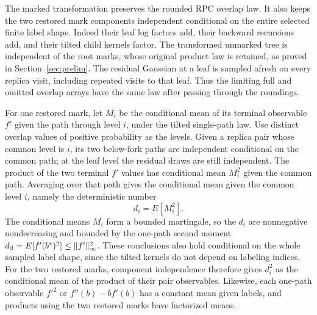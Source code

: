 \documentclass[11pt]{article}
\begin{document}
The marked transformation preserves the rounded RPC overlap law. It also
keeps the two restored mark components independent conditional on the
entire selected finite label shape. Indeed their leaf log factors add,
their backward recursions add, and their tilted child kernels factor.
The transformed unmarked tree is independent of the root marks, whose
original product law is retained, as proved in
Section~\ref{sec:prelim}. The residual Gaussian at a leaf is sampled
afresh on every replica visit, including repeated visits to that leaf.
Thus the limiting full and omitted overlap arrays have the same law after
passing through the roundings.

For one restored mark, let $M_i$ be the conditional mean of its terminal
observable $f'$ given the path through level $i$, under the tilted
single-path law. Use distinct overlap values of positive probability as
the levels. Given a replica pair whose common level is $i$, its two
below-fork paths are independent conditional on the common path; at the
leaf level the residual draws are still independent. The product of the two terminal $f'$ values has conditional mean
$M_i^2$ given the common path. Averaging over that path gives the
conditional mean given the common level $i$, namely the deterministic number
\[
 d_i=E[M_i^2].
\]
The conditional means $M_i$ form a bounded martingale, so the $d_i$ are
nonnegative nondecreasing and bounded by the one-path second moment
$d_{\rm d}=E[f'(b^*)^2]\le\|f'\|_\infty^2$. These conclusions also hold
conditional on the whole sampled label shape, since the tilted kernels
do not depend on labeling indices. For the two restored marks, component
independence therefore gives $d_i^2$ as the conditional mean of the product
of their pair observables. Likewise, each one-path observable $f'^2$ or
$f''(b)-b f'(b)$ has a constant mean given labels, and products using the
two restored marks have factorized means.
\end{document}
